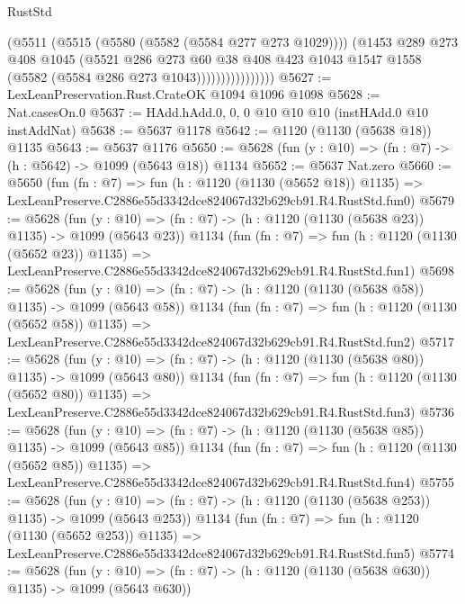 \begin{lexlean}{RustStd}
\begin{coremodule}
                          (@5511
                            (@5515 (@5580 (@5582 (@5584 @277 @273 @1029))))
                            (@1453
                              @289
                              @273
                              @408
                              @1045
                              (@5521
                                @286
                                @273
                                @60
                                @38
                                @408
                                @423
                                @1043
                                @1547
                                @1558
                                (@5582 (@5584 @286 @273 @1043))))))))))))))))
@5627 := LexLeanPreservation.Rust.CrateOK @1094 @1096 @1098
@5628 := Nat.casesOn.{0}
@5637 := HAdd.hAdd.{0, 0, 0} @10 @10 @10 (instHAdd.{0} @10 instAddNat)
@5638 := @5637 @1178
@5642 := @1120 (@1130 (@5638 @18)) @1135
@5643 := @5637 @1176
@5650 := @5628 (fun (y : @10) => (fn : @7) -> (h : @5642) -> @1099 (@5643 @18)) @1134
@5652 := @5637 Nat.zero
@5660 := @5650
    (fun (fn : @7) =>
    fun (h : @1120 (@1130 (@5652 @18)) @1135) =>
    LexLeanPreserve.C2886e55d3342dce824067d32b629cb91.R4.RustStd.fun0)
@5679 := @5628
    (fun (y : @10) => (fn : @7) -> (h : @1120 (@1130 (@5638 @23)) @1135) -> @1099 (@5643 @23))
    @1134
    (fun (fn : @7) =>
    fun (h : @1120 (@1130 (@5652 @23)) @1135) =>
    LexLeanPreserve.C2886e55d3342dce824067d32b629cb91.R4.RustStd.fun1)
@5698 := @5628
    (fun (y : @10) => (fn : @7) -> (h : @1120 (@1130 (@5638 @58)) @1135) -> @1099 (@5643 @58))
    @1134
    (fun (fn : @7) =>
    fun (h : @1120 (@1130 (@5652 @58)) @1135) =>
    LexLeanPreserve.C2886e55d3342dce824067d32b629cb91.R4.RustStd.fun2)
@5717 := @5628
    (fun (y : @10) => (fn : @7) -> (h : @1120 (@1130 (@5638 @80)) @1135) -> @1099 (@5643 @80))
    @1134
    (fun (fn : @7) =>
    fun (h : @1120 (@1130 (@5652 @80)) @1135) =>
    LexLeanPreserve.C2886e55d3342dce824067d32b629cb91.R4.RustStd.fun3)
@5736 := @5628
    (fun (y : @10) => (fn : @7) -> (h : @1120 (@1130 (@5638 @85)) @1135) -> @1099 (@5643 @85))
    @1134
    (fun (fn : @7) =>
    fun (h : @1120 (@1130 (@5652 @85)) @1135) =>
    LexLeanPreserve.C2886e55d3342dce824067d32b629cb91.R4.RustStd.fun4)
@5755 := @5628
    (fun (y : @10) => (fn : @7) -> (h : @1120 (@1130 (@5638 @253)) @1135) -> @1099 (@5643 @253))
    @1134
    (fun (fn : @7) =>
    fun (h : @1120 (@1130 (@5652 @253)) @1135) =>
    LexLeanPreserve.C2886e55d3342dce824067d32b629cb91.R4.RustStd.fun5)
@5774 := @5628
    (fun (y : @10) => (fn : @7) -> (h : @1120 (@1130 (@5638 @630)) @1135) -> @1099 (@5643 @630))

\end{coremodule}
\end{lexlean}
